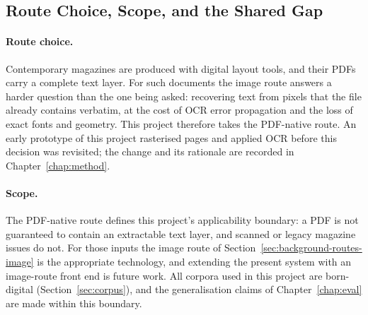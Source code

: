 \subsection{Route Choice, Scope, and the Shared Gap}
\label{sec:background-routes-gap}

\paragraph{Route choice.} Contemporary magazines are produced with
digital layout tools, and their PDFs carry a complete text layer. For
such documents the image route answers a harder question than the one
being asked: recovering text from pixels that the file already
contains verbatim, at the cost of OCR error propagation
\cite{kim2021donut} and the loss of exact fonts and geometry. This
project therefore takes the PDF-native route. An early prototype of
this project rasterised pages and applied OCR before this decision was
revisited; the change and its rationale are recorded in
Chapter~\ref{chap:method}.

\paragraph{Scope.} The PDF-native route defines this project's
applicability boundary: a PDF is not guaranteed to contain an
extractable text layer, and scanned or legacy magazine issues do not.
For those inputs the image route of
Section~\ref{sec:background-routes-image} is the appropriate technology, and
extending the present system with an image-route front end is future
work. All corpora used in this project are born-digital
(Section~\ref{sec:corpus}), and the generalisation claims of
Chapter~\ref{chap:eval} are made within this boundary.

